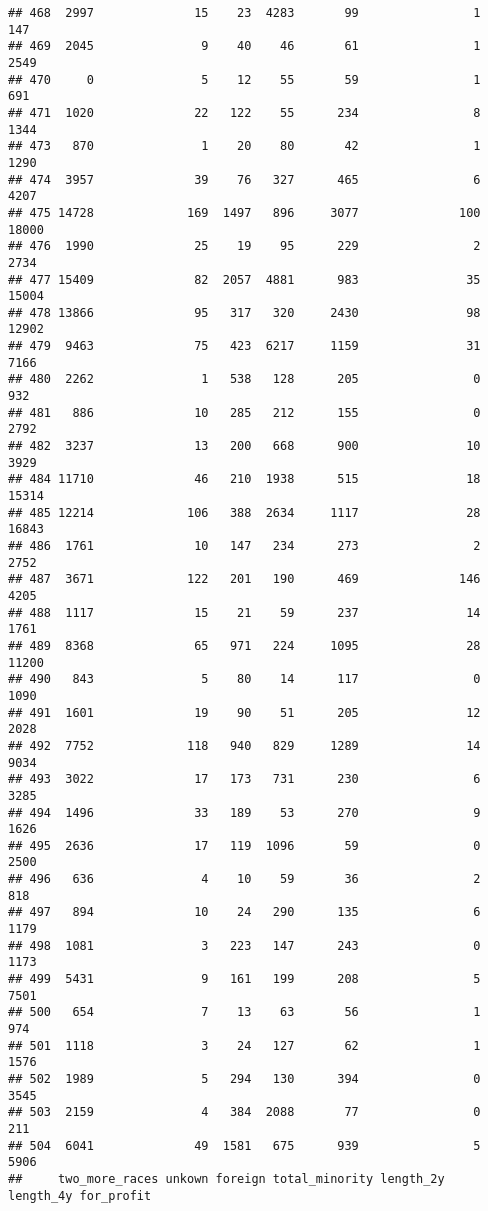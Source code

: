 \documentclass[
]{article}
\begin{document}
\begin{verbatim}
## 468  2997              15    23  4283       99                1   147
## 469  2045               9    40    46       61                1  2549
## 470     0               5    12    55       59                1   691
## 471  1020              22   122    55      234                8  1344
## 473   870               1    20    80       42                1  1290
## 474  3957              39    76   327      465                6  4207
## 475 14728             169  1497   896     3077              100 18000
## 476  1990              25    19    95      229                2  2734
## 477 15409              82  2057  4881      983               35 15004
## 478 13866              95   317   320     2430               98 12902
## 479  9463              75   423  6217     1159               31  7166
## 480  2262               1   538   128      205                0   932
## 481   886              10   285   212      155                0  2792
## 482  3237              13   200   668      900               10  3929
## 484 11710              46   210  1938      515               18 15314
## 485 12214             106   388  2634     1117               28 16843
## 486  1761              10   147   234      273                2  2752
## 487  3671             122   201   190      469              146  4205
## 488  1117              15    21    59      237               14  1761
## 489  8368              65   971   224     1095               28 11200
## 490   843               5    80    14      117                0  1090
## 491  1601              19    90    51      205               12  2028
## 492  7752             118   940   829     1289               14  9034
## 493  3022              17   173   731      230                6  3285
## 494  1496              33   189    53      270                9  1626
## 495  2636              17   119  1096       59                0  2500
## 496   636               4    10    59       36                2   818
## 497   894              10    24   290      135                6  1179
## 498  1081               3   223   147      243                0  1173
## 499  5431               9   161   199      208                5  7501
## 500   654               7    13    63       56                1   974
## 501  1118               3    24   127       62                1  1576
## 502  1989               5   294   130      394                0  3545
## 503  2159               4   384  2088       77                0   211
## 504  6041              49  1581   675      939                5  5906
##     two_more_races unkown foreign total_minority length_2y length_4y for_profit

\end{verbatim}
\end{document}
